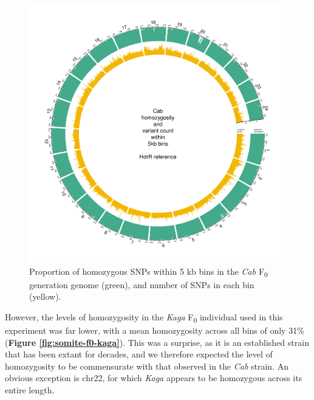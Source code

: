 \documentclass[
]{book}
\begin{document}
\begin{figure}
\includegraphics[width=1\linewidth]{figs/somites/Cab} \caption{Proportion of homozygous SNPs within 5 kb bins in the \emph{Cab} F\textsubscript{0} generation genome (green), and number of SNPs in each bin (yellow).}\label{fig:somite-f0-cab}
\end{figure}

\clearpage

However, the levels of homozygosity in the \emph{Kaga} F\textsubscript{0} individual used in this experiment was far lower, with a mean homozygosity across all bins of only 31\% (\textbf{Figure \ref{fig:somite-f0-kaga}}). This was a surprise, as it is an established strain that has been extant for decades, and we therefore expected the level of homozygosity to be commensurate with that observed in the \emph{Cab} strain. An obvious exception is chr22, for which \emph{Kaga} appears to be homozygous across its entire length.
\end{document}
